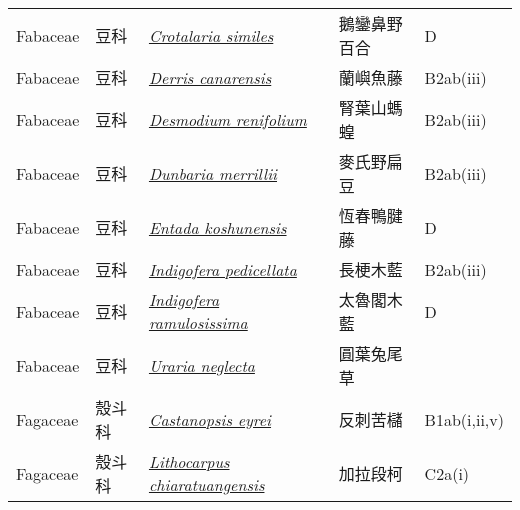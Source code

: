 {\begin{longtable}{p{2.5cm}p{2.5cm}p{4.5cm}p{2.5cm}p{3cm}}
    Fabaceae & 豆科 & \href{http://www.theplantlist.org/tpl1.1/search?q=Crotalaria+similes}{\textit{Crotalaria similes} } & 鵝鑾鼻野百合 & D \index{Crotalaria@\textit{Crotalaria}!similes@\textit{similes}}  \index{鵝鑾鼻野百合} \\
    Fabaceae & 豆科 & \href{http://www.theplantlist.org/tpl1.1/search?q=Derris+canarensis}{\textit{Derris canarensis} } & 蘭嶼魚藤 & B2ab(iii) \index{Derris@\textit{Derris}!canarensis@\textit{canarensis}}  \index{蘭嶼魚藤} \\
    Fabaceae & 豆科 & \href{http://www.theplantlist.org/tpl1.1/search?q=Desmodium+renifolium}{\textit{Desmodium renifolium} } & 腎葉山螞蝗 & B2ab(iii) \index{Desmodium@\textit{Desmodium}!renifolium@\textit{renifolium}}  \index{腎葉山螞蝗} \\
    Fabaceae & 豆科 & \href{http://www.theplantlist.org/tpl1.1/search?q=Dunbaria+merrillii}{\textit{Dunbaria merrillii} } & 麥氏野扁豆 & B2ab(iii) \index{Dunbaria@\textit{Dunbaria}!merrillii@\textit{merrillii}}  \index{麥氏野扁豆} \\
    Fabaceae & 豆科 & \href{http://www.theplantlist.org/tpl1.1/search?q=Entada+koshunensis}{\textit{Entada koshunensis} } & 恆春鴨腱藤 & D \index{Entada@\textit{Entada}!koshunensis@\textit{koshunensis}}  \index{恆春鴨腱藤} \\
    Fabaceae & 豆科 & \href{http://www.theplantlist.org/tpl1.1/search?q=Indigofera+pedicellata}{\textit{Indigofera pedicellata} } & 長梗木藍 & B2ab(iii) \index{Indigofera@\textit{Indigofera}!pedicellata@\textit{pedicellata}}  \index{長梗木藍} \\
    Fabaceae & 豆科 & \href{http://www.theplantlist.org/tpl1.1/search?q=Indigofera+ramulosissima}{\textit{Indigofera ramulosissima} } & 太魯閣木藍 & D \index{Indigofera@\textit{Indigofera}!ramulosissima@\textit{ramulosissima}}  \index{太魯閣木藍} \\
    Fabaceae & 豆科 & \href{http://www.theplantlist.org/tpl1.1/search?q=Uraria+neglecta}{\textit{Uraria neglecta} } & 圓葉兔尾草 &  \index{Uraria@\textit{Uraria}!neglecta@\textit{neglecta}}  \index{圓葉兔尾草} \\
    Fagaceae & 殼斗科 & \href{http://www.theplantlist.org/tpl1.1/search?q=Castanopsis+eyrei}{\textit{Castanopsis eyrei} } & 反刺苦櫧 & B1ab(i,ii,v) \index{Castanopsis@\textit{Castanopsis}!eyrei@\textit{eyrei}}  \index{反刺苦櫧} \\
    Fagaceae & 殼斗科 & \href{http://www.theplantlist.org/tpl1.1/search?q=Lithocarpus+chiaratuangensis}{\textit{Lithocarpus chiaratuangensis} } & 加拉段柯 & C2a(i) \index{Lithocarpus@\textit{Lithocarpus}!chiaratuangensis@\textit{chiaratuangensis}}  \index{加拉段柯} \\

\end{longtable}}
